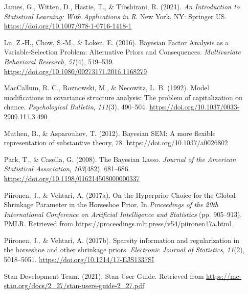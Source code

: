 \documentclass[
  english,
  man]{apa6}
\newlength{\cslhangindent}
\newlength{\cslentryspacingunit} %
\newenvironment{CSLReferences}[2] %
 {%
  \setlength{\parindent}{0pt}
  \ifodd #1
  \let\oldpar\par
  \def\par{\hangindent=\cslhangindent\oldpar}
  \fi
  \setlength{\parskip}{#2\cslentryspacingunit}
 }%
 {}
\begin{document}
\begin{CSLReferences}{1}{0}
\leavevmode{}%
James, G., Witten, D., Hastie, T., \& Tibshirani, R. (2021). \emph{An {Introduction} to {Statistical} {Learning}: With {Applications} in {R}}. New York, NY: Springer US. \url{https://doi.org/10.1007/978-1-0716-1418-1}

\leavevmode{}%
Lu, Z.-H., Chow, S.-M., \& Loken, E. (2016). Bayesian {Factor} {Analysis} as a {Variable}-{Selection} {Problem}: {Alternative} {Priors} and {Consequences}. \emph{Multivariate Behavioral Research}, \emph{51}(4), 519--539. \url{https://doi.org/10.1080/00273171.2016.1168279}

\leavevmode{}%
MacCallum, R. C., Roznowski, M., \& Necowitz, L. B. (1992). Model modifications in covariance structure analysis: The problem of capitalization on chance. \emph{Psychological Bulletin}, \emph{111}(3), 490--504. \url{https://doi.org/10.1037/0033-2909.111.3.490}

\leavevmode{}%
Muthen, B., \& Asparouhov, T. (2012). Bayesian {SEM}: {A} more ﬂexible representation of substantive theory, 78. \url{https://doi.org/10.1037/a0026802}

\leavevmode{}%
Park, T., \& Casella, G. (2008). The {Bayesian} {Lasso}. \emph{Journal of the American Statistical Association}, \emph{103}(482), 681--686. \url{https://doi.org/10.1198/016214508000000337}

\leavevmode{}%
Piironen, J., \& Vehtari, A. (2017a). On the {Hyperprior} {Choice} for the {Global} {Shrinkage} {Parameter} in the {Horseshoe} {Prior}. In \emph{Proceedings of the 20th {International} {Conference} on {Artificial} {Intelligence} and {Statistics}} (pp. 905--913). PMLR. Retrieved from \url{https://proceedings.mlr.press/v54/piironen17a.html}

\leavevmode{}%
Piironen, J., \& Vehtari, A. (2017b). Sparsity information and regularization in the horseshoe and other shrinkage priors. \emph{Electronic Journal of Statistics}, \emph{11}(2), 5018--5051. \url{https://doi.org/10.1214/17-EJS1337SI}

\leavevmode{}%
Stan Development Team. (2021). Stan {User} {Guide}. Retrieved from \url{https://mc-stan.org/docs/2_27/stan-users-guide-2_27.pdf}


\end{CSLReferences}
\end{document}
